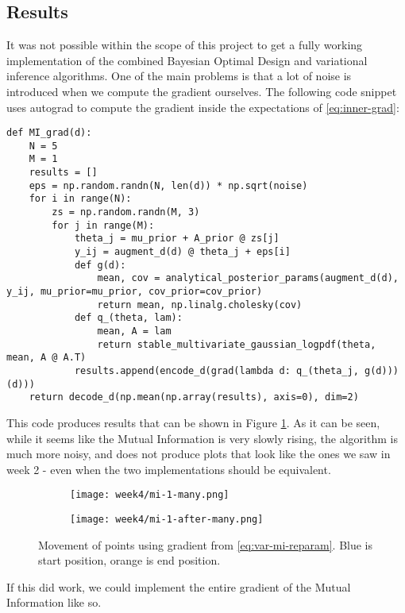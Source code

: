 \subsection{Results}
It was not possible within the scope of this project to get a fully working implementation of the combined Bayesian Optimal Design and variational inference algorithms.
One of the main problems is that a lot of noise is introduced when we compute the gradient ourselves. 
The following code snippet uses autograd to compute the gradient inside the expectations of \eqref{eq:inner-grad}:
\begin{verbatim}
def MI_grad(d):
    N = 5
    M = 1
    results = []
    eps = np.random.randn(N, len(d)) * np.sqrt(noise)
    for i in range(N):
        zs = np.random.randn(M, 3)
        for j in range(M):
            theta_j = mu_prior + A_prior @ zs[j]
            y_ij = augment_d(d) @ theta_j + eps[i]
            def g(d):
                mean, cov = analytical_posterior_params(augment_d(d), y_ij, mu_prior=mu_prior, cov_prior=cov_prior)
                return mean, np.linalg.cholesky(cov)
            def q_(theta, lam):
                mean, A = lam
                return stable_multivariate_gaussian_logpdf(theta, mean, A @ A.T)
            results.append(encode_d(grad(lambda d: q_(theta_j, g(d)))(d)))
    return decode_d(np.mean(np.array(results), axis=0), dim=2)
\end{verbatim}
This code produces results that can be shown in Figure \ref{fig:mi-1-var}. 
As it can be seen, while it seems like the Mutual Information is very slowly rising, the algorithm is much more noisy, 
and does not produce plots that look like the ones we saw in week 2 - even when the two implementations should be equivalent.\\
\begin{figure}
  \centering
  \begin{subfigure}{0.45\textwidth}
    \texttt{[image: week4/mi-1-many.png]}
  \end{subfigure}
  \begin{subfigure}{0.45\textwidth}
    \texttt{[image: week4/mi-1-after-many.png]}
  \end{subfigure}
  \caption{Movement of points using gradient from \eqref{eq:var-mi-reparam}. Blue is start position, orange is end position.}
  \label{fig:mi-1-var}
\end{figure}
If this did work, we could implement the entire gradient of the Mutual Information like so.
